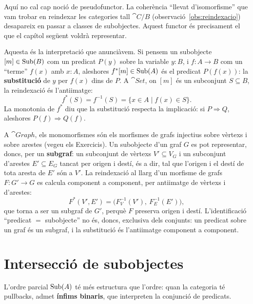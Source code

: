 \begin{observacio}
Aquí no cal cap noció de pseudofunctor. La coherència \enquote{llevat d'isomorfisme} que vam trobar en reindexar les categories tall $\cat{C}/B$ (observació~\ref{obs:reindexacio}) desapareix en passar a classes de subobjectes. Aquest functor és precisament el que el capítol següent voldrà representar.
\end{observacio}

\begin{observacio}[La substitució]
Aquesta és la interpretació que anunciàvem. Si pensem un subobjecte $[m]\in\operatorname{Sub}(B)$ com un predicat $P(y)$ sobre la variable $y:B$, i $f\colon A\to B$ com un \enquote{terme} $f(x)$ amb $x:A$, aleshores $f^{*}[m]\in\operatorname{Sub}(A)$ és el predicat $P(f(x))$: la \textbf{substitució} de $y$ per $f(x)$ dins de $P$. A $\cat{Set}$, on $[m]$ és un subconjunt $S\subseteq B$, la reindexació és l'antiimatge:
\[
f^{*}(S)=f^{-1}(S)=\{x\in A\mid f(x)\in S\}.
\]
La monotonia de $f^{*}$ diu que la substitució respecta la implicació: si $P\Rightarrow Q$, aleshores $P(f)\Rightarrow Q(f)$.
\end{observacio}

\begin{exemple}[Subgrafs]\label{ex:subgrafs}
A $\cat{Graph}$, els monomorfismes són els morfismes de grafs injectius sobre vèrtexs i sobre arestes (vegeu els Exercicis). Un subobjecte d'un graf $G$ es pot representar, doncs, per un \textbf{subgraf}: un subconjunt de vèrtexs $V'\subseteq V_G$ i un subconjunt d'arestes $E'\subseteq E_G$ tancat per origen i destí, és a dir, tal que l'origen i el destí de tota aresta de $E'$ són a $V'$. La reindexació al llarg d'un morfisme de grafs $F\colon G'\to G$ es calcula component a component, per antiimatge de vèrtexs i d'arestes:
\[
F^{*}(V',E')=\bigl(F_V^{-1}(V'),\ F_E^{-1}(E')\bigr),
\]
que torna a ser un subgraf de $G'$, perquè $F$ preserva origen i destí. L'identificació \enquote{predicat $=$ subobjecte} no és, doncs, exclusiva dels conjunts: un predicat sobre un graf és un subgraf, i la substitució és l'antiimatge component a component.
\end{exemple}

\section{Intersecció de subobjectes}

L'ordre parcial $\operatorname{Sub}(A)$ té més estructura que l'ordre: quan la categoria té pullbacks, admet \textbf{ínfims binaris}, que interpreten la conjunció de predicats.

